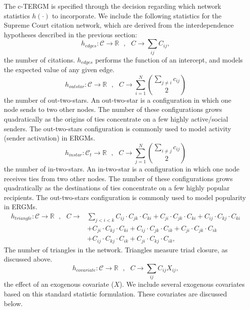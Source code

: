 \documentclass[headsepline=true, abstracton]{scrartcl}
\begin{document}
The c-TERGM is specified through 
the decision regarding which network statistics $h(\cdot)$ to incorporate. We include the following statistics for the Supreme Court citation network, which are derived from the interdependence hypotheses described in the previous section:
$$h_{edges}:\mathcal{C} \to \mathbb{R}~~~, ~~~C \to \sum_{ij} C_{ij}, $$
the number of citations.  $h_{edges}$ performs the function of an intercept, and models the expected value of any given edge.
$$h_{outstar}:\mathcal{C} \to \mathbb{R}~~~, ~~~C \to \sum_{i=1}^N {\sum_{j \neq i} c_{ij} \choose 2} $$
the number of out-two-stars. An out-two-star is a configuration in which one node sends to two other nodes. The number of these configurations grows quadratically as the origins of ties concentrate on a few highly active/social senders. The out-two-stars configuration is commonly used to model activity (sender activation) in ERGMs.
$$h_{instar}:\mathcal{C}_t \to \mathbb{R}~~~, ~~~C \to \sum_{j=1}^N {\sum_{i \neq j} c_{ij} \choose 2} $$
the number of in-two-stars. An in-two-star is a configuration in which one node receives ties from two other nodes. The number of these configurations grows quadratically as the destinations of ties concentrate on a few highly popular recipients. The out-two-stars configuration is commonly used to model popularity in ERGMs.
\begin{align*}
h_{triangle}:\mathcal{C} \to \mathbb{R}~~~, ~~~C \to & \sum_{j<i<k} C_{ij}\cdot C_{jk} \cdot C_{ki} + C_{ji}\cdot C_{jk} \cdot C_{ki} + C_{ij}\cdot C_{kj} \cdot C_{ki} \\ & + C_{ji}\cdot C_{kj} \cdot C_{ki} + C_{ij}\cdot C_{jk} \cdot C_{ik} + C_{ji}\cdot C_{jk} \cdot C_{ik}  \\ & + C_{ij}\cdot C_{kj} \cdot C_{ik} + C_{ji}\cdot C_{kj} \cdot C_{ik},  
\end{align*}
The number of triangles in the network.  Triangles measure triad closure, as discussed above. $$h_{covariate}:\mathcal{C} \to \mathbb{R}~~~, ~~~C \to \sum_{ij} C_{ij}X_{ij}, $$ the effect of an exogenous covariate ($X$). We include several exogenous covariates based on this standard statistic formulation. These covariates are discussed below.
\end{document}
